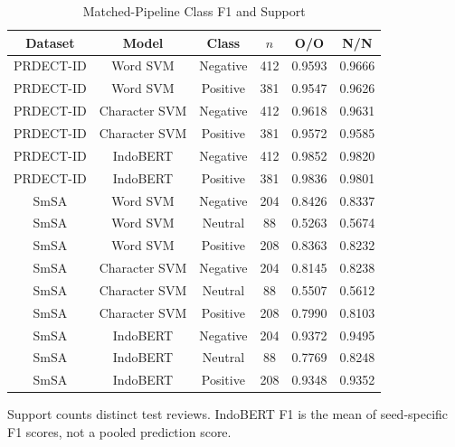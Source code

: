 \documentclass[conference]{IEEEtran}
\begin{document}
\begin{table}[!ht]
\caption{Matched-Pipeline Class F1 and Support}
\centering\small
\renewcommand{\arraystretch}{1.06}
\setlength{\tabcolsep}{2.2pt}
\begin{tabular}{|c|c|c|c|c|c|}
\hline
\textbf{Dataset} & \textbf{Model} & \textbf{Class} & \textbf{$n$} & \textbf{O/O} & \textbf{N/N} \\
\hline
PRDECT-ID & Word SVM & Negative & 412 & 0.9593 & 0.9666 \\
\hline
PRDECT-ID & Word SVM & Positive & 381 & 0.9547 & 0.9626 \\
\hline
PRDECT-ID & Character SVM & Negative & 412 & 0.9618 & 0.9631 \\
\hline
PRDECT-ID & Character SVM & Positive & 381 & 0.9572 & 0.9585 \\
\hline
PRDECT-ID & IndoBERT & Negative & 412 & 0.9852 & 0.9820 \\
\hline
PRDECT-ID & IndoBERT & Positive & 381 & 0.9836 & 0.9801 \\
\hline
SmSA & Word SVM & Negative & 204 & 0.8426 & 0.8337 \\
\hline
SmSA & Word SVM & Neutral & 88 & 0.5263 & 0.5674 \\
\hline
SmSA & Word SVM & Positive & 208 & 0.8363 & 0.8232 \\
\hline
SmSA & Character SVM & Negative & 204 & 0.8145 & 0.8238 \\
\hline
SmSA & Character SVM & Neutral & 88 & 0.5507 & 0.5612 \\
\hline
SmSA & Character SVM & Positive & 208 & 0.7990 & 0.8103 \\
\hline
SmSA & IndoBERT & Negative & 204 & 0.9372 & 0.9495 \\
\hline
SmSA & IndoBERT & Neutral & 88 & 0.7769 & 0.8248 \\
\hline
SmSA & IndoBERT & Positive & 208 & 0.9348 & 0.9352 \\
\hline
\end{tabular}
\par\vspace{3pt}\raggedright\small Support counts distinct test reviews. IndoBERT F1 is the mean of seed-specific F1 scores, not a pooled prediction score.
\end{table}
\end{document}
